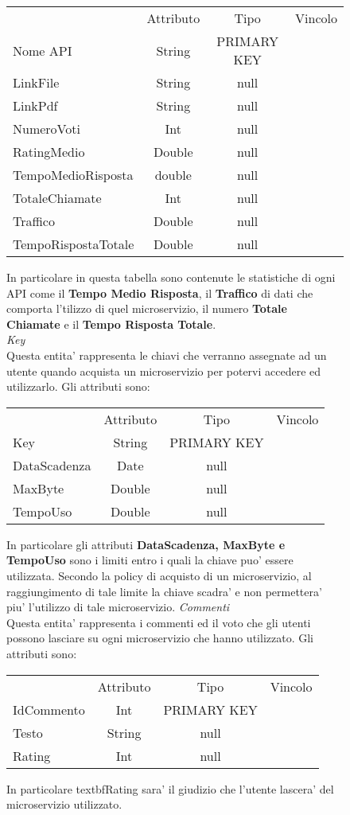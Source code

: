 {{\begin{figure}[ht]
\begin{center}
\begin{tabular}{lccc}
				&Attributo&Tipo&Vincolo\\
				Nome API&String&PRIMARY KEY\\
				LinkFile&String&null\\
				LinkPdf&String&null \\
				NumeroVoti&Int&null \\
				RatingMedio&Double&null \\
				TempoMedioRisposta&double&null \\
				TotaleChiamate&Int&null \\
				Traffico&Double&null \\
				TempoRispostaTotale&Double&null \\
			\end{tabular}
			\end{center}
			In particolare in questa tabella sono contenute le statistiche di ogni API come il \textbf{Tempo Medio Risposta}, il \textbf{Traffico} di dati che comporta l'tilizzo di quel microservizio, il numero \textbf{Totale Chiamate} e il \textbf{Tempo Risposta Totale}. \\
			\textit{Key}\\
			Questa entita' rappresenta le chiavi che verranno assegnate ad un utente quando acquista un microservizio per potervi accedere ed utilizzarlo. Gli attributi sono: \\
			\begin{center}
			\begin{tabular}{lccc}
				&Attributo&Tipo&Vincolo\\
				Key&String&PRIMARY KEY\\
				DataScadenza&Date&null \\
				MaxByte&Double&null \\
				TempoUso&Double&null \\
			\end{tabular}
			\end{center}
			In particolare gli attributi \textbf{DataScadenza, MaxByte e TempoUso} sono i limiti entro i quali la chiave puo' essere utilizzata. Secondo la policy di acquisto di un microservizio, al raggiungimento di tale limite la chiave scadra' e non permettera' piu' l'utilizzo di tale microservizio.
			\textit{Commenti}\\
			Questa entita' rappresenta i commenti ed il voto  che gli utenti possono lasciare su ogni microservizio che hanno utilizzato. Gli attributi sono:
			\begin{center}
			\begin{tabular}{lccc}
				&Attributo&Tipo&Vincolo\\
				IdCommento&Int&PRIMARY KEY\\
				Testo&String&null \\
				Rating&Int&null \\
			\end{tabular}
			\end{center}
			In particolare textbf{Rating} sara' il giudizio che l'utente lascera' del microservizio utilizzato. \\
			

\end{figure}}}
